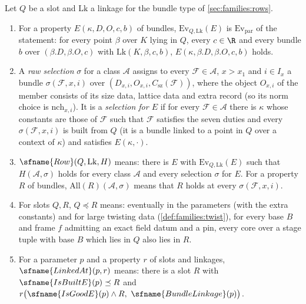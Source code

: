 \begin{definition}\label{pf:linkN:rows}
Let $Q$ be a slot and $\mathrm{Lk}$ a linkage for the bundle type of \cref{sec:families:rows}.
\begin{enumerate}[label=(\alph*)]
\item For a property $E(\kappa,D,O,c,b)$ of bundles, $\mathrm{Ev}_{Q,\mathrm{Lk}}(E)$ is $\mathrm{Ev}_{\mathrm{par}}$ of the statement: for every
point $\beta$ over $K$ lying in $Q$, every $c\in\R$ and every bundle $b$ over $(\beta.D,\beta.O,c)$ with $\mathrm{Lk}(K,\beta,c,b)$,
$E(\kappa,\beta.D,\beta.O,c,b)$ holds.
\item A \emph{raw selection} $\sigma$ for a class $\mathcal A$ assigns to every $\mathcal F\in\mathcal A$, $x>x_1$ and $i\in I_x$ a bundle
$\sigma(\mathcal F,x,i)$ over $(D_{x,i},O_{x,i},C_{\mathrm{sz}}(\mathcal F))$, where the object $O_{x,i}$ of the member consists of its
size data, lattice data and extra record (so its norm choice is $\mathrm{nch}_{x,i}$). It is a \emph{selection for $E$} if for every
$\mathcal F\in\mathcal A$ there is $\kappa$ whose constants are those of $\mathcal F$ such that $\mathcal F$ satisfies the seven duties
and every $\sigma(\mathcal F,x,i)$ is built from $Q$ (it is a bundle linked to a point in $Q$ over a context of $\kappa$) and satisfies
$E(\kappa,\cdot)$.
\item $\sfname{Row}(Q,\mathrm{Lk},H)$ means: there is $E$ with $\mathrm{Ev}_{Q,\mathrm{Lk}}(E)$ such that $H(\mathcal A,\sigma)$ holds for every
class $\mathcal A$ and every selection $\sigma$ for $E$. For a property $R$ of bundles, $\mathrm{All}(R)(\mathcal A,\sigma)$ means that
$R$ holds at every $\sigma(\mathcal F,x,i)$.
\item For slots $Q,R$, $Q\preceq R$ means: eventually in the parameters (with the extra constants) and for large twisting data
(\cref{def:families:twist}), for every base $B$ and frame $f$ admitting an exact field datum and a pin, every core over a stage tuple
with base $B$ which lies in $Q$ also lies in $R$.
\item For a parameter $p$ and a property $r$ of slots and linkages, $\sfname{LinkedAt}(p,r)$ means: there is a slot $R$ with
$\sfname{IsBuiltE}(p)\preceq R$ and $r\bigl(\sfname{IsGoodE}(p)\wedge R,\ \sfname{BundleLinkage}(p)\bigr)$.
\end{enumerate}
\end{definition}


